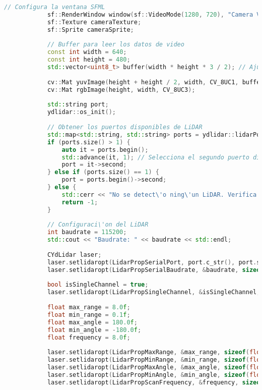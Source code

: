 \begin{lstlisting}[language={C++}, caption={Primera versi\'on del c\'odigo del sistema de control del robot}, label={PrimeraVersionCodigoRobot}]
            // Configura la ventana SFML
            sf::RenderWindow window(sf::VideoMode(1280, 720), "Camera Visualization with LiDAR");
            sf::Texture cameraTexture;
            sf::Sprite cameraSprite;
        
            // Buffer para leer los datos de video
            const int width = 640;
            const int height = 480;
            std::vector<uint8_t> buffer(width * height * 3 / 2); // Ajusta el tama\~no del buffer para YUV420
        
            cv::Mat yuvImage(height + height / 2, width, CV_8UC1, buffer.data());
            cv::Mat rgbImage(height, width, CV_8UC3);
        
            std::string port;
            ydlidar::os_init();
        
            // Obtener los puertos disponibles de LiDAR
            std::map<std::string, std::string> ports = ydlidar::lidarPortList();
            if (ports.size() > 1) {
                auto it = ports.begin();
                std::advance(it, 1); // Selecciona el segundo puerto disponible
                port = it->second;
            } else if (ports.size() == 1) {
                port = ports.begin()->second;
            } else {
                std::cerr << "No se detect\'o ning\'un LiDAR. Verifica la conexi\'on." << std::endl;
                return -1;
            }
        
            // Configuraci\'on del LiDAR
            int baudrate = 115200;
            std::cout << "Baudrate: " << baudrate << std::endl;
        
            CYdLidar laser;
            laser.setlidaropt(LidarPropSerialPort, port.c_str(), port.size());
            laser.setlidaropt(LidarPropSerialBaudrate, &baudrate, sizeof(int));
        
            bool isSingleChannel = true;
            laser.setlidaropt(LidarPropSingleChannel, &isSingleChannel, sizeof(bool));
        
            float max_range = 8.0f;
            float min_range = 0.1f;
            float max_angle = 180.0f;
            float min_angle = -180.0f;
            float frequency = 8.0f;
        
            laser.setlidaropt(LidarPropMaxRange, &max_range, sizeof(float));
            laser.setlidaropt(LidarPropMinRange, &min_range, sizeof(float));
            laser.setlidaropt(LidarPropMaxAngle, &max_angle, sizeof(float));
            laser.setlidaropt(LidarPropMinAngle, &min_angle, sizeof(float));
            laser.setlidaropt(LidarPropScanFrequency, &frequency, sizeof(float));
        

\end{lstlisting}
